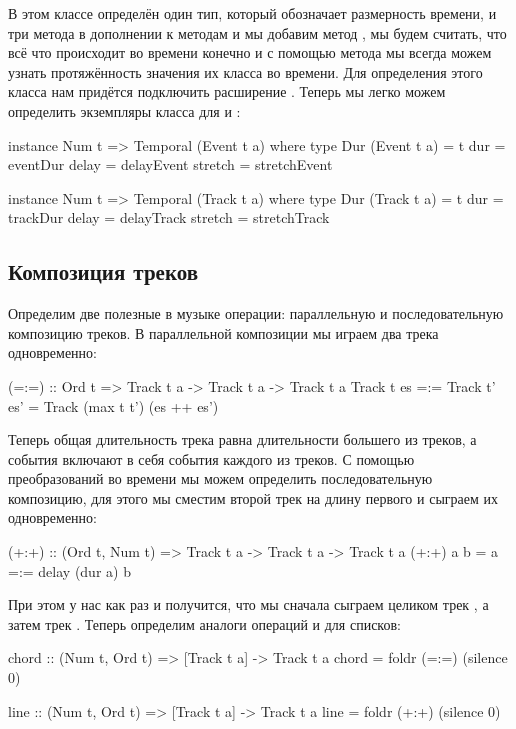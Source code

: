 В этом классе определён один тип, который обозначает
размерность времени, и три метода в дополнении к методам
 и  мы добавим метод ,
мы будем считать, что всё что происходит во времени конечно
и с помощью метода  мы всегда можем узнать 
протяжённость значения их класса  во времени.
Для определения этого класса нам придётся подключить
расширение . Теперь мы легко можем
определить экземпляры класса  для 
 и :

\begin{code}
instance Num t => Temporal (Event t a) where
    type Dur (Event t a) = t
    dur     = eventDur
    delay   = delayEvent
    stretch = stretchEvent

instance Num t => Temporal (Track t a) where
    type Dur (Track t a) = t
    dur     = trackDur
    delay   = delayTrack
    stretch = stretchTrack    
\end{code}

\subsection{Композиция треков}

Определим две полезные в музыке операции: параллельную
и последовательную композицию треков. В параллельной
композиции мы играем два трека одновременно:

\begin{code}
(=:=) :: Ord t => Track t a -> Track t a -> Track t a
Track t es =:= Track t' es' = Track (max t t') (es ++ es')
\end{code}

Теперь общая длительность трека равна длительности большего
из треков, а события включают в себя события каждого из
треков. С помощью преобразований во времени мы можем определить 
последовательную композицию, для этого мы сместим второй
трек на длину первого и сыграем их одновременно:

\begin{code}
(+:+) :: (Ord t, Num t) => Track t a -> Track t a -> Track t a
(+:+) a b = a =:= delay (dur a) b
\end{code}

При этом у нас как раз и  получится, что мы сначала сыграем целиком
трек , а затем трек . Теперь определим аналоги
операций \In{=:=} и \In{+:+} для списков:

\begin{code}
chord :: (Num t, Ord t) => [Track t a] -> Track t a
chord = foldr (=:=) (silence 0)

line :: (Num t, Ord t) => [Track t a] -> Track t a
line = foldr (+:+) (silence 0)
\end{code}

